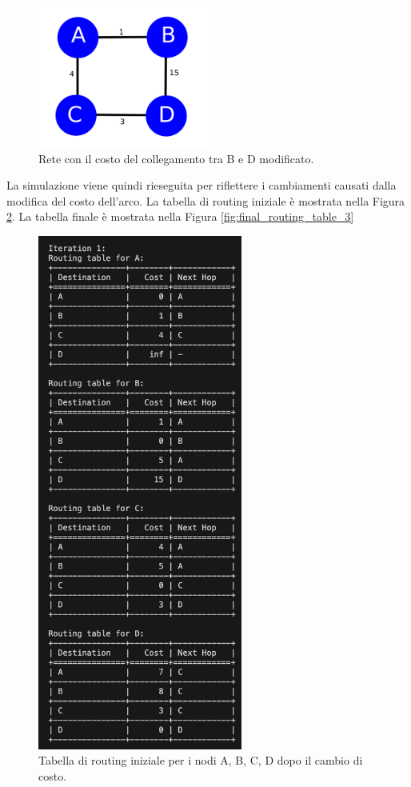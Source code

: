 \documentclass{report}
\begin{document}
\begin{figure}[H]
    \centering
    \includegraphics[width=0.5\textwidth]{img/Img3.png}
    \caption{Rete con il costo del collegamento tra B e D modificato.}
    \label{fig:modified_network_2}
\end{figure}

La simulazione viene quindi rieseguita per riflettere i cambiamenti causati dalla modifica del costo dell'arco. La tabella di routing iniziale è mostrata nella Figura \ref{fig:initial_routing_table_3}. La tabella finale è mostrata nella Figura \ref{fig:final_routing_table_3}

\begin{figure}[H]
    \centering
    \includegraphics[width=0.6\textwidth]{img/rete3inizio.png}
    \caption{Tabella di routing iniziale per i nodi A, B, C, D dopo il cambio di costo.}
    \label{fig:initial_routing_table_3}
\end{figure}
\end{document}
